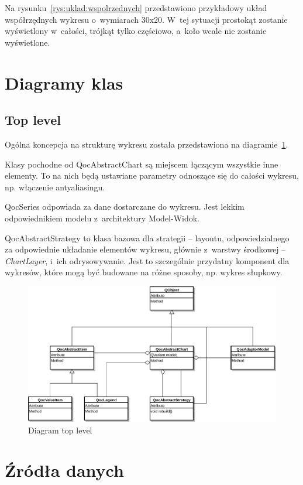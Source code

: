 Na rysunku~\ref{rys:uklad:wspolrzednych} przedstawiono przykładowy układ współrzędnych wykresu o~wymiarach 30x20. W~tej sytuacji prostokąt zostanie wyświetlony w~całości, trójkąt tylko częściowo, a~koło wcale nie zostanie wyświetlone.

\section{Diagramy klas}

\subsection{Top level}
Ogólna koncepcja na strukturę wykresu została przedstawiona na diagramie~\ref{rys:klasy:top_level}.

Klasy pochodne od QocAbstractChart są miejscem łączącym wszystkie inne elementy. To na nich będą ustawiane parametry odnoszące się do całości wykresu, np. włączenie antyaliasingu.

QocSeries odpowiada za dane dostarczane do wykresu. Jest lekkim odpowiednikiem modelu z~architektury Model-Widok.

QocAbstractStrategy to klasa bazowa dla strategii -- layoutu, odpowiedzialnego za odpowiednie układanie elementów wykresu, głównie z~warstwy środkowej -- \textit{ChartLayer}, i~ich odrysowywanie. Jest to szczególnie przydatny komponent dla wykresów, które mogą być budowane na różne sposoby, np. wykres słupkowy.


\begin{figure}[H]
\centering
\includegraphics[scale=0.7]{img/klasy-top_level.pdf}
\caption{Diagram top level}\label{rys:klasy:top_level}
\end{figure}

\section{Źródła danych}

